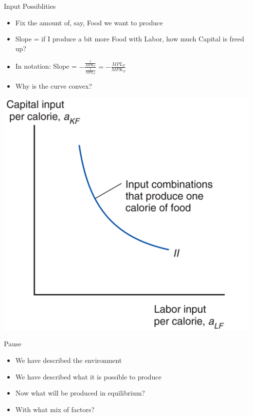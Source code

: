 \documentclass[ignorenonframetext,]{beamer}
\begin{document}
\begin{frame}{Input Possiblities}

    \begin{itemize}
        \item Fix the amount of, say, Food we want to produce 
        \item Slope = if I produce a bit more Food with Labor, how much Capital is freed up? 
        \item In notation: Slope = $-\frac{\frac{1}{MPK_F}}{\frac{1}{MPL_F}} = -\frac{MPL_F}{MPK_F}$ 
        \item Why is the curve convex?
    \end{itemize}
    \includegraphics[scale=0.15]{input_poss.png}

\end{frame}

\begin{frame}{Pause}

    \begin{itemize}
        \item We have described the environment
        \item We have described what it is possible to produce
        \item Now what will be produced in equilibrium?
        \item With what mix of factors?
    \end{itemize}

\end{frame}
\end{document}
